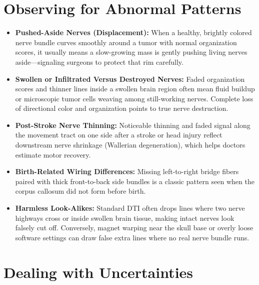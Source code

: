\section{Observing for Abnormal Patterns}

\begin{itemize}
    \item \textbf{Pushed-Aside Nerves (Displacement):} When a healthy, brightly colored nerve bundle curves smoothly around a tumor with normal organization scores, it usually means a slow-growing mass is gently pushing living nerves aside---signaling surgeons to protect that rim carefully.
    \item \textbf{Swollen or Infiltrated Versus Destroyed Nerves:} Faded organization scores and thinner lines inside a swollen brain region often mean fluid buildup or microscopic tumor cells weaving among still-working nerves. Complete loss of directional color and organization points to true nerve destruction.
    \item \textbf{Post-Stroke Nerve Thinning:} Noticeable thinning and faded signal along the movement tract on one side after a stroke or head injury reflect downstream nerve shrinkage (Wallerian degeneration), which helps doctors estimate motor recovery.
    \item \textbf{Birth-Related Wiring Differences:} Missing left-to-right bridge fibers paired with thick front-to-back side bundles is a classic pattern seen when the corpus callosum did not form before birth.
    \item \textbf{Harmless Look-Alikes:} Standard DTI often drops lines where two nerve highways cross or inside swollen brain tissue, making intact nerves look falsely cut off. Conversely, magnet warping near the skull base or overly loose software settings can draw false extra lines where no real nerve bundle runs.
\end{itemize}

\section{Dealing with Uncertainties}

